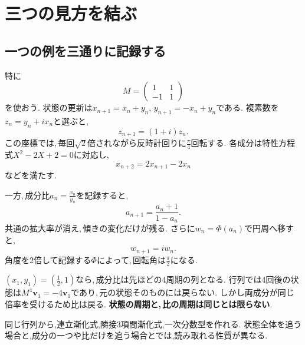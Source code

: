 \section{三つの見方を結ぶ}\label{節：三つの見方を結ぶ}
\subsection{一つの例を三通りに記録する}

特に
\[
 M=\begin{pmatrix}1&1\\-1&1\end{pmatrix}
\]
を使おう.
状態の更新は$x_{n+1}=x_n+y_n,\,y_{n+1}=-x_n+y_n$である.
複素数を$z_n=y_n+ix_n$と選ぶと,
\[
 z_{n+1}=(1+i)z_n.
\]
この座標では,\,毎回$\sqrt2$倍されながら反時計回りに$\frac{\pi}{4}$回転する.
各成分は特性方程式$X^2-2X+2=0$に対応し,
\[
 x_{n+2}=2x_{n+1}-2x_n
\]
などを満たす.

一方,\,成分比$a_n=\frac{x_n}{y_n}$を記録すると,
\[
 a_{n+1}=\frac{a_n+1}{1-a_n}.
\]
共通の拡大率が消え,\,傾きの変化だけが残る.
さらに$w_n=\Phi(a_n)$で円周へ移すと,
\[
 w_{n+1}=iw_n.
\]
角度を2倍して記録する$\Phi$によって,\,回転角は$\frac{\pi}{2}$になる.

$(x_1,y_1)=(\frac12,1)$なら,\,成分比は先ほどの4周期の列となる.
行列では4回後の状態は$M^4\boldsymbol v_1=-4\boldsymbol v_1$であり,\,元の状態そのものには戻らない.
しかし両成分が同じ倍率を受けるため比は戻る.
\textbf{状態の周期と,\,比の周期は同じとは限らない}.


\begin{bookpoint}
同じ行列から,連立漸化式,隣接3項間漸化式,一次分数型を作れる.
状態全体を追う場合と,成分の一つや比だけを追う場合とでは,読み取れる性質が異なる.
\end{bookpoint}
